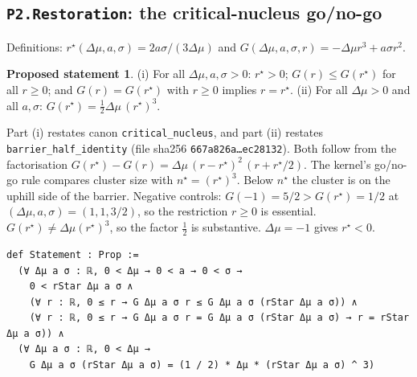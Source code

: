 \documentclass[11pt]{article}
\theoremstyle{definition}
\newtheorem{proposal}[theorem]{Proposed statement}
\theoremstyle{remark}
\begin{document}
\subsection{\texttt{P2.Restoration}: the critical-nucleus go/no-go}
Definitions: $r^\star(\Delta\mu,a,\sigma)=2a\sigma/(3\Delta\mu)$ and $G(\Delta\mu,a,\sigma,r)=-\Delta\mu r^3+a\sigma r^2$.
\begin{proposal}
(i) For all $\Delta\mu,a,\sigma>0$: $r^\star>0$; $G(r)\le G(r^\star)$ for all $r\ge0$; and $G(r)=G(r^\star)$ with $r\ge0$ implies $r=r^\star$.
(ii) For all $\Delta\mu>0$ and all $a,\sigma$: $G(r^\star)=\tfrac12\Delta\mu\,(r^\star)^3$.
\end{proposal}
Part (i) restates canon \texttt{critical\_nucleus}, and part (ii) restates \texttt{barrier\_half\_identity}
(file sha256 \texttt{667a826a\ldots ec28132}).
Both follow from the factorisation $G(r^\star)-G(r)=\Delta\mu\,(r-r^\star)^2\,(r+r^\star/2)$.
The kernel's go/no-go rule compares cluster size with $n^\star=(r^\star)^3$. Below $n^\star$ the cluster is on the uphill side of the barrier.
Negative controls: $G(-1)=5/2>G(r^\star)=1/2$ at $(\Delta\mu,a,\sigma)=(1,1,3/2)$, so the restriction $r\ge0$ is essential.
$G(r^\star)\ne\Delta\mu(r^\star)^3$, so the factor $\tfrac12$ is substantive.
$\Delta\mu=-1$ gives $r^\star<0$.
\begin{lstlisting}
def Statement : Prop :=
  (∀ Δμ a σ : ℝ, 0 < Δμ → 0 < a → 0 < σ →
    0 < rStar Δμ a σ ∧
    (∀ r : ℝ, 0 ≤ r → G Δμ a σ r ≤ G Δμ a σ (rStar Δμ a σ)) ∧
    (∀ r : ℝ, 0 ≤ r → G Δμ a σ r = G Δμ a σ (rStar Δμ a σ) → r = rStar Δμ a σ)) ∧
  (∀ Δμ a σ : ℝ, 0 < Δμ →
    G Δμ a σ (rStar Δμ a σ) = (1 / 2) * Δμ * (rStar Δμ a σ) ^ 3)
\end{lstlisting}
\end{document}
